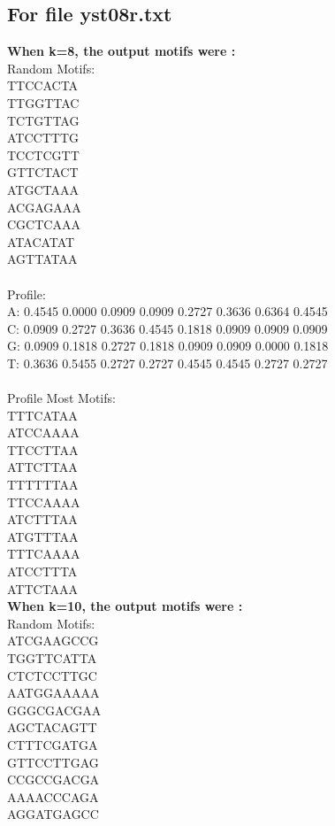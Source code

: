 \documentclass{report}
\begin{document}
\subsection{For file yst08r.txt}
\textbf{When k=8, the output motifs were :}\\
Random Motifs:\\
TTCCACTA\\
TTGGTTAC\\
TCTGTTAG\\
ATCCTTTG\\
TCCTCGTT\\
GTTCTACT\\
ATGCTAAA\\
ACGAGAAA\\
CGCTCAAA\\
ATACATAT\\
AGTTATAA\\
\\
Profile:\\
A: 0.4545 0.0000 0.0909 0.0909 0.2727 0.3636 0.6364 0.4545\\
C: 0.0909 0.2727 0.3636 0.4545 0.1818 0.0909 0.0909 0.0909\\
G: 0.0909 0.1818 0.2727 0.1818 0.0909 0.0909 0.0000 0.1818\\
T: 0.3636 0.5455 0.2727 0.2727 0.4545 0.4545 0.2727 0.2727\\
\\
Profile Most Motifs:\\
TTTCATAA\\
ATCCAAAA\\
TTCCTTAA\\
ATTCTTAA\\
TTTTTTAA\\
TTCCAAAA\\
ATCTTTAA\\
ATGTTTAA\\
TTTCAAAA\\
ATCCTTTA\\
ATTCTAAA\\
\textbf{When k=10, the output motifs were :}\\
Random Motifs:\\
ATCGAAGCCG\\
TGGTTCATTA\\
CTCTCCTTGC\\
AATGGAAAAA\\
GGGCGACGAA\\
AGCTACAGTT\\
CTTTCGATGA\\
GTTCCTTGAG\\
CCGCCGACGA\\
AAAACCCAGA\\
AGGATGAGCC\\
\end{document}
